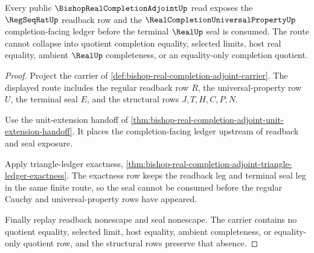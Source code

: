 \begin{theorem}
\label{thm:bishop-real-completion-adjoint-regular-cauchy-forward-route}
Every public $\BishopRealCompletionAdjointUp$ read exposes the $\RegSeqRatUp$ readback row and the $\RealCompletionUniversalPropertyUp$ completion-facing ledger before the terminal $\RealUp$ seal is consumed. The route cannot collapse into quotient completion equality, selected limits, host real equality, ambient $\RealUp$ completeness, or an equality-only completion quotient.
\end{theorem}
\begin{proof}
Project the carrier of \autoref{def:bishop-real-completion-adjoint-carrier}. The displayed route includes the regular readback row $R$, the universal-property row $U$, the terminal seal $E$, and the structural rows $J,T,H,C,P,N$.

Use the unit-extension handoff of \autoref{thm:bishop-real-completion-adjoint-unit-extension-handoff}. It places the completion-facing ledger upstream of readback and seal exposure.

Apply triangle-ledger exactness, \autoref{thm:bishop-real-completion-adjoint-triangle-ledger-exactness}. The exactness row keeps the readback leg and terminal seal leg in the same finite route, so the seal cannot be consumed before the regular Cauchy and universal-property rows have appeared.

Finally replay readback nonescape and seal nonescape. The carrier contains no quotient equality, selected limit, host equality, ambient completeness, or equality-only quotient row, and the structural rows preserve that absence.
\end{proof}
